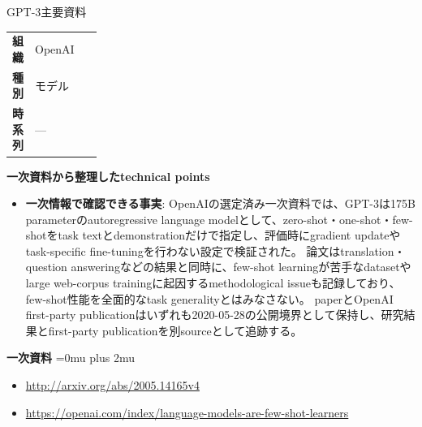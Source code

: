 \begin{technicalnote}{GPT-3}{主要資料}
\begingroup
\begin{tabularx}{\linewidth}{@{}>{\bfseries}p{0.22\linewidth}X@{}}
組織 & OpenAI \\
種別 & モデル \\
時系列 & — \\
\end{tabularx}
\smallskip
{\bfseries 一次資料から整理したtechnical points}
\begin{itemize}[leftmargin=1.5em,itemsep=0.35em]
\item \textbf{一次情報で確認できる事実}: OpenAIの選定済み一次資料では、GPT-3は175B parameterのautoregressive language modelとして、zero-shot・one-shot・few-shotをtask textとdemonstrationだけで指定し、評価時にgradient updateやtask-specific fine-tuningを行わない設定で検証された。 論文はtranslation・question answeringなどの結果と同時に、few-shot learningが苦手なdatasetやlarge web-corpus trainingに起因するmethodological issueも記録しており、few-shot性能を全面的なtask generalityとはみなさない。 paperとOpenAI first-party publicationはいずれも2020-05-28の公開境界として保持し、研究結果とfirst-party publicationを別sourceとして追跡する。
\end{itemize}
\begin{minipage}{\linewidth}
\begin{samepage}
{\bfseries 一次資料}
\begingroup\sloppy
\Urlmuskip=0mu plus 2mu\relax
\begin{itemize}[leftmargin=1.5em,itemsep=0.25em]
\item {\scriptsize\url{http://arxiv.org/abs/2005.14165v4}}
\item {\scriptsize\url{https://openai.com/index/language-models-are-few-shot-learners}}
\end{itemize}
\endgroup
\end{samepage}
\end{minipage}
\endgroup
\end{technicalnote}
\medskip
